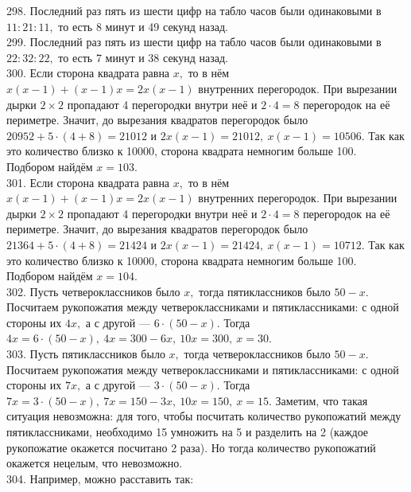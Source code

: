 \documentclass[12pt]{article}
\begin{document}
298. Последний раз пять из шести цифр на табло часов были одинаковыми в $11:21:11,$ то есть 8 минут и 49 секунд назад.\\
299. Последний раз пять из шести цифр на табло часов были одинаковыми в $22:32:22,$ то есть 7 минут и 38 секунд назад.\\
300. Если сторона квадрата равна $x,$ то в нём $x(x-1)+(x-1)x=2x(x-1)$ внутренних перегородок. При вырезании дырки $2\times2$ пропадают 4 перегородки внутри неё и $2\cdot4=8$ перегородок на её периметре. Значит, до вырезания квадратов перегородок было $20952+5\cdot(4+8)=21012$ и $2x(x-1)=21012,\ x(x-1)=10506.$ Так как это количество близко к 10000, сторона квадрата немногим больше 100. Подбором найдём $x=103.$\\
301. Если сторона квадрата равна $x,$ то в нём $x(x-1)+(x-1)x=2x(x-1)$ внутренних перегородок. При вырезании дырки $2\times2$ пропадают 4 перегородки внутри неё и $2\cdot4=8$ перегородок на её периметре. Значит, до вырезания квадратов перегородок было $21364+5\cdot(4+8)=21424$ и $2x(x-1)=21424,\ x(x-1)=10712.$ Так как это количество близко к 10000, сторона квадрата немногим больше 100. Подбором найдём $x=104.$\\
302. Пусть четвероклассников было $x,$ тогда пятиклассников было  $50-x.$ Посчитаем рукопожатия между четвероклассниками и пятиклассниками: с одной стороны их $4x,$ а с другой --- $6\cdot(50-x).$ Тогда $4x=6\cdot(50-x),\
4x=300-6x,\ 10x=300,\ x=30.$\\
303. Пусть пятиклассников было $x,$ тогда четвероклассников было  $50-x.$ Посчитаем рукопожатия между четвероклассниками и пятиклассниками: с одной стороны их $7x,$ а с другой --- $3\cdot(50-x).$ Тогда $7x=3\cdot(50-x),\
7x=150-3x,\ 10x=150,\ x=15.$ Заметим, что такая ситуация невозможна: для того, чтобы посчитать количество рукопожатий между пятиклассниками, необходимо 15 умножить на 5 и разделить на 2 (каждое рукопожатие окажется посчитано 2 раза). Но тогда количество рукопожатий окажется нецелым, что невозможно.\\
304. Например, можно расставить так:
\begin{figure}[ht!]
\end{figure}\\
\end{document}
